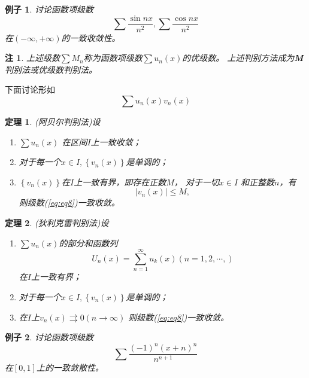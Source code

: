 \documentclass[a4paper,12pt]{article}
\newtheorem{theorem}{定理}
\newtheorem{example}{例子}
\newtheorem{remark}{注}
\let\oldref\ref
\renewcommand{\ref}[1]{\rm{(\oldref{#1})}}
\begin{document}
\begin{example}
    讨论函数项级数
    \[
        \sum \frac{\sin nx}{n^2}, \sum \frac{\cos nx}{n^2}
        \]
    在$\displaystyle \left(-\infty, +\infty\right)$的一致收敛性。
\end{example}

\begin{remark}
    上述级数$\displaystyle \sum M_n$称为函数项级数$\displaystyle \sum u_n(x)$的优级数。
    上述判别方法成为\textbf{M}判别法或优级数判别法。
\end{remark}

下面讨论形如
\begin{equation}
    \sum u_n(x)v_n(x)
    \label{eq:eq8}
\end{equation}
\begin{theorem}{\rm(阿贝尔判别法)}设
    \begin{enumerate}[label={\rm(\arabic*)}]
        \item $\displaystyle \sum u_n(x)$ 在区间$I$上一致收敛；
        \item 对于每一个$x \in I, \left\{v_n(x)\right\}$是单调的；
        \item $\displaystyle \left\{v_n(x)\right\}$在$I$上一致有界，即存在正数$M$，
            对于一切$x \in I$ 和正整数$n$，有
            \[
                \left|v_n(x)\right| \le M,
                \]
            则级数\ref{eq:eq8}一致收敛。
    \end{enumerate}
\end{theorem}

\begin{theorem}{\rm(狄利克雷判别法)}设
    \begin{enumerate}[label={\rm(\arabic*)}]
        \item $\displaystyle \sum u_n(x)$的部分和函数列
            \[
                U_n(x) = \sum_{n=1}^{\infty} u_k(x) (n = 1, 2, \cdots,)
                \]
            在$I$上一致有界；
        \item 对于每一个$x \in I, \left\{v_n(x)\right\}$是单调的；
        \item 在$I$上$\displaystyle v_n(x) \rightrightarrows 0(n \to \infty)$
            则级数\ref{eq:eq8}一致收敛。
    \end{enumerate}
\end{theorem}

\begin{example}
    讨论函数项级数
    \[
        \sum \frac{(-1)^n(x+n)^n}{n^{n+1}}
        \]
    在$[0,1]$上的一致敛散性。
\end{example}
\end{document}
